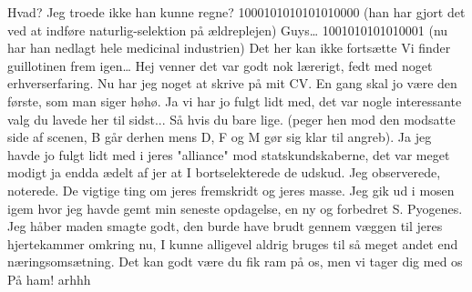 \documentclass[a4paper,11pt]{article}
\begin{document}
\begin{sketch}
 Hvad? Jeg troede ikke han kunne regne?
 1000101010101010000 (han har gjort det ved at indføre naturlig-selektion på ældreplejen) 
 Guys\ldots
{} 1001010101010001 (nu har han nedlagt hele medicinal industrien)
 Det her kan ikke fortsætte
 Vi finder guillotinen frem igen…
 Hej venner det var godt nok lærerigt, fedt med noget erhverserfaring. Nu har jeg noget at skrive på mit CV. En gang skal jo være den første, som man siger høhø.
 Ja vi har jo fulgt lidt med, det var nogle interessante valg du lavede her til sidst...  
 Så hvis du bare lige. (peger hen mod den modsatte side af scenen, B går derhen mens D, F og M gør sig klar til angreb). 
 Ja jeg havde jo fulgt lidt med i jeres "alliance" mod statskundskaberne, det var meget modigt ja endda ædelt af jer at I bortselekterede de udskud. Jeg observerede, noterede. De vigtige ting om jeres fremskridt og jeres masse. Jeg gik ud i mosen igem hvor jeg havde gemt min seneste opdagelse, en ny og forbedret S. Pyogenes. Jeg håber maden smagte godt, den burde have brudt gennem væggen til jeres hjertekammer omkring nu, I kunne alligevel aldrig bruges til så meget andet end næringsomsætning. 
 Det kan godt være du fik ram på os, men vi tager dig med os På ham!
 arhhh
\end{sketch}
\end{document}
